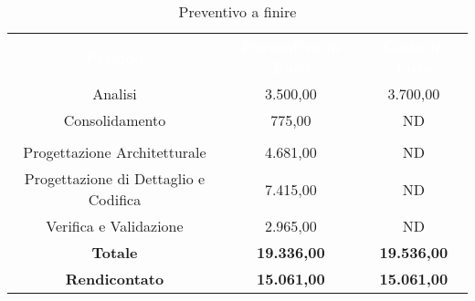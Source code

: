 \begin{table}[H]
	\centering
	\begin{tabular}{ccc}
	\rowcolor{greySWEight}
	\textcolor{white}{\textbf{Periodo}} &
	\textcolor{white}{\textbf{Preventivo in Euro}} & 
	\textcolor{white}{\textbf{Costo in Euro}} \\
	Analisi & 3.500,00 & 3.700,00 \\
	Consolidamento & 775,00 & ND \\
	\rowcolor{greySWEight}
	\multicolumn{3}{c}{ \textcolor{white}{\textbf{Rendicontato}} } \\
	Progettazione Architetturale & 4.681,00 & ND \\
	Progettazione di Dettaglio e Codifica & 7.415,00 & ND \\
	Verifica e Validazione & 2.965,00 & ND \\
	\hline	
	\textbf{Totale} & \textbf{19.336,00} & \textbf{19.536,00} \\
	\textbf{Rendicontato} & \textbf{15.061,00} & \textbf{15.061,00} \\
	\end{tabular}
	\caption{Preventivo a finire}
\end{table}
